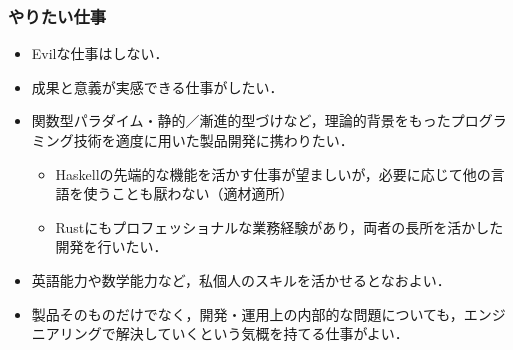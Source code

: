 \documentclass[a4j]{ltjsarticle}
\begin{document}
\subsubsection*{やりたい仕事}
\begin{itemize}
  \item Evilな仕事はしない．
  \item 成果と意義が実感できる仕事がしたい．
  \item 関数型パラダイム・静的／漸進的型づけなど，理論的背景をもったプログラミング技術を適度に用いた製品開発に携わりたい．
  \begin{itemize}
    \item Haskellの先端的な機能を活かす仕事が望ましいが，必要に応じて他の言語を使うことも厭わない（適材適所）
    \item Rustにもプロフェッショナルな業務経験があり，両者の長所を活かした開発を行いたい．
  \end{itemize}
  \item 英語能力や数学能力など，私個人のスキルを活かせるとなおよい．
  \item 製品そのものだけでなく，開発・運用上の内部的な問題についても，エンジニアリングで解決していくという気概を持てる仕事がよい．
\end{itemize}

\end{document}
